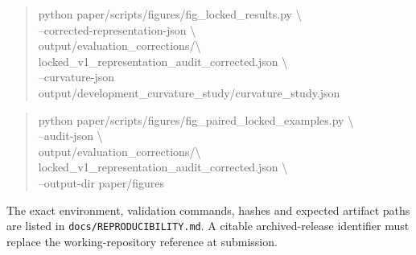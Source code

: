 \begin{quote}\small\ttfamily
python paper/scripts/figures/fig\_locked\_results.py \textbackslash\\
\hspace*{1em}--corrected-representation-json \textbackslash\\
\hspace*{2em}output/evaluation\_corrections/\textbackslash\\
\hspace*{2em}locked\_v1\_representation\_audit\_corrected.json
\textbackslash\\
\hspace*{1em}--curvature-json
output/development\_curvature\_study/curvature\_study.json
\end{quote}

\begin{quote}\small\ttfamily
python paper/scripts/figures/fig\_paired\_locked\_examples.py
\textbackslash\\
\hspace*{1em}--audit-json \textbackslash\\
\hspace*{2em}output/evaluation\_corrections/\textbackslash\\
\hspace*{2em}locked\_v1\_representation\_audit\_corrected.json
\textbackslash\\
\hspace*{1em}--output-dir paper/figures
\end{quote}

The exact environment, validation commands, hashes and expected artifact paths
are listed in \texttt{docs/REPRODUCIBILITY.md}. A citable archived-release identifier
must replace the working-repository reference at submission.

